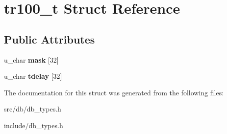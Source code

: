 \hypertarget{structtr100__t}{
\section{tr100\_\-t Struct Reference}
\label{structtr100__t}
}
\subsection*{Public Attributes}
\begin{DoxyCompactItemize}
\item 
\hypertarget{structtr100__t_a42953494cfbcca7677c0e414f0826560}{
u\_\-char {\bfseries mask} \mbox{[}32\mbox{]}}
\label{structtr100__t_a42953494cfbcca7677c0e414f0826560}

\item 
\hypertarget{structtr100__t_a64dba3c8a9440af09692dabb53f1c249}{
u\_\-char {\bfseries tdelay} \mbox{[}32\mbox{]}}
\label{structtr100__t_a64dba3c8a9440af09692dabb53f1c249}

\end{DoxyCompactItemize}


The documentation for this struct was generated from the following files:\begin{DoxyCompactItemize}
\item 
src/db/db\_\-types.h\item 
include/db\_\-types.h\end{DoxyCompactItemize}
